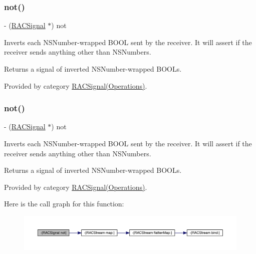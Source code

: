 \subsubsection{\texorpdfstring{not()}{not()}\hspace{0.1cm}{\footnotesize\ttfamily [1/3]}}
{\footnotesize\ttfamily -\/ (\mbox{\hyperlink{interface_r_a_c_signal}{R\+A\+C\+Signal}} $\ast$) not \begin{DoxyParamCaption}{ }\end{DoxyParamCaption}}

Inverts each N\+S\+Number-\/wrapped B\+O\+OL sent by the receiver. It will assert if the receiver sends anything other than N\+S\+Numbers.

Returns a signal of inverted N\+S\+Number-\/wrapped B\+O\+O\+Ls. 

Provided by category \mbox{\hyperlink{category_r_a_c_signal_07_operations_08_a53de1c418b57ee4c60d20f561db04717}{R\+A\+C\+Signal(\+Operations)}}.

\mbox{\label{interface_r_a_c_signal_a53de1c418b57ee4c60d20f561db04717}} 
\subsubsection{\texorpdfstring{not()}{not()}\hspace{0.1cm}{\footnotesize\ttfamily [2/3]}}
{\footnotesize\ttfamily -\/ (\mbox{\hyperlink{interface_r_a_c_signal}{R\+A\+C\+Signal}} $\ast$) not \begin{DoxyParamCaption}{ }\end{DoxyParamCaption}}

Inverts each N\+S\+Number-\/wrapped B\+O\+OL sent by the receiver. It will assert if the receiver sends anything other than N\+S\+Numbers.

Returns a signal of inverted N\+S\+Number-\/wrapped B\+O\+O\+Ls. 

Provided by category \mbox{\hyperlink{category_r_a_c_signal_07_operations_08_a53de1c418b57ee4c60d20f561db04717}{R\+A\+C\+Signal(\+Operations)}}.

Here is the call graph for this function\+:\nopagebreak
\begin{figure}[H]
\begin{center}
\leavevmode
\includegraphics[width=350pt]{interface_r_a_c_signal_a53de1c418b57ee4c60d20f561db04717_cgraph}
\end{center}
\end{figure}
\mbox{\label{interface_r_a_c_signal_a53de1c418b57ee4c60d20f561db04717}} 
